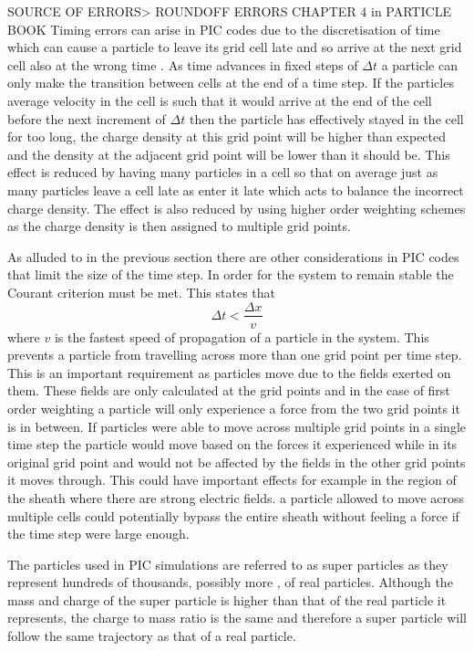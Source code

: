 \documentclass[12pt]{article}
\def\be{\begin{equation}}
\def\ee{\end{equation}}
\begin{document}
SOURCE OF ERRORS> ROUNDOFF ERRORS CHAPTER 4 in PARTICLE BOOK 
Timing errors can arise in PIC codes due to the discretisation of time which can cause a particle to leave its grid cell late and so arrive at the next grid cell also at the wrong time \cite{Birdsall1997141}. As time advances in fixed steps of $\Delta t$ a particle can only make the transition between cells at the end of a time step. If the particles average velocity in the cell is such that it would arrive at the end of the cell before the next increment of $\Delta t$ then the particle has effectively stayed in the cell for too long, the charge density at this grid point will be higher than expected and the density at the adjacent grid point will be lower than it should be. This effect is reduced by having many particles in a cell so that on average just as many particles leave a cell late as enter it late which acts to balance the incorrect charge density. The effect is also reduced by using higher order weighting schemes as the charge density is then assigned to multiple grid points. 

As alluded to in the previous section there are other considerations in PIC codes that limit the size of the time step. In order for the system to remain stable the Courant criterion must be met. This states that 
\be 
\Delta t < \frac{\Delta x }{v}
\ee
where $v$ is the fastest speed of propagation of a particle in the system. This prevents a particle from travelling across more than one grid point per time step. This is an important requirement as particles move due to the fields exerted on them. These fields are only calculated at the grid points and in the case of first order weighting a particle will only experience a force from the two grid points it is in between. If particles were able to move across multiple grid points in a single time step the particle would move based on the forces it experienced while in its original grid point and would not be affected by the fields in the other grid points it moves through. This could have important effects for example in the region of the sheath where there are strong electric fields. a particle allowed to move across multiple cells could potentially bypass the entire sheath without feeling a force if the time step were large enough. 


The particles used in PIC simulations are referred to as super particles as they represent hundreds of thousands, possibly more , of real particles. Although the mass and charge of the super particle is higher than that of the real particle it represents, the charge to mass ratio is the same and therefore a super particle will follow the same trajectory as that of a real particle. 
\end{document}

